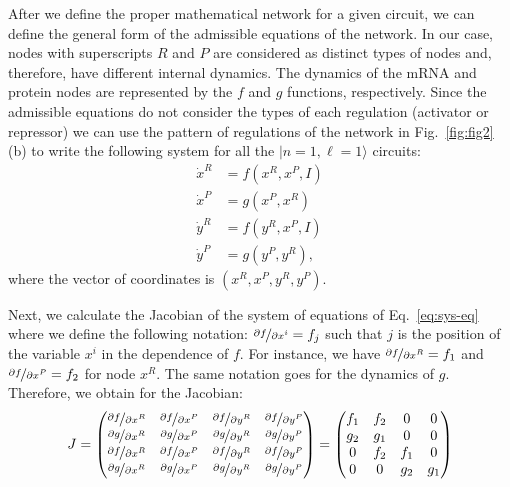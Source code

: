 \documentclass[12pt]{article}
\begin{document}
After we define the proper mathematical network for a given circuit, we can 
define the general form of the admissible equations of the network. In our case,
nodes with superscripts $R$ and $P$ are considered as distinct types of nodes and,
therefore, have different internal dynamics. The dynamics of the mRNA and protein
nodes are represented by the $f$ and $g$ functions, respectively. Since the 
admissible equations do not consider the types of each regulation (activator 
or repressor) we can use the pattern of regulations of the network in 
Fig.~\ref{fig:fig2}(b) to write the following system for all the 
$|n=1,\ell = 1 \rangle$ circuits:
\begin{equation} \label{eq:sys-eq}
    \begin{aligned}
        \dot{x}^R &= f(x^R, x^P, I)\\
        \dot{x}^P &= g(x^P, x^R)\\
        \dot{y}^R &= f(y^R, x^P, I)\\
        \dot{y}^P &= g(y^P, y^R),
    \end{aligned}
\end{equation}
where the vector of coordinates is $(x^R, x^P, y^R, y^P)$.

Next, we calculate the Jacobian of the system of equations of Eq.~\ref{eq:sys-eq} 
where we define the following notation: $\nicefrac{\partial f}{\partial x^i} = f_j$ 
such that $j$ is the position of the variable $x^i$ in the dependence of $f$. 
For instance, we have $\nicefrac{\partial f}{\partial x^R} = f_1$ and 
$\nicefrac{\partial f}{\partial x^P} = f_2$ for node $x^R$. The same notation 
goes for the dynamics of $g$. Therefore, we obtain for the Jacobian:
\begin{equation}
    J = \begin{pmatrix}
        \nicefrac{\partial f}{\partial x^R} & \nicefrac{\partial f}{\partial x^P} &
        \nicefrac{\partial f}{\partial y^R} & \nicefrac{\partial f}{\partial y^P} \\
        \nicefrac{\partial g}{\partial x^R} & \nicefrac{\partial g}{\partial x^P} &
        \nicefrac{\partial g}{\partial y^R} & \nicefrac{\partial g}{\partial y^P} \\
        \nicefrac{\partial f}{\partial x^R} & \nicefrac{\partial f}{\partial x^P} &
        \nicefrac{\partial f}{\partial y^R} & \nicefrac{\partial f}{\partial y^P} \\
        \nicefrac{\partial g}{\partial x^R} & \nicefrac{\partial g}{\partial x^P} &
        \nicefrac{\partial g}{\partial y^R} & \nicefrac{\partial g}{\partial y^P}
    \end{pmatrix} = 
    \begin{pmatrix}
        f_1 & f_2 & 0 & 0 \\
        g_2 & g_1 & 0 & 0 \\
        0 & f_2 & f_1 & 0 \\
        0 & 0 & g_2 & g_1 
    \end{pmatrix}
\end{equation}
\end{document}
